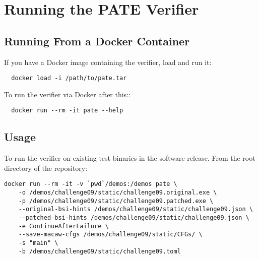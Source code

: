 
\section{Running the PATE Verifier}
\label{sec:runn-pate-verif}

\subsection{Running From a Docker Container}
\label{sec:running-from-docker}

If you have a Docker image containing the verifier, load and run it:
\begin{verbatim}
  docker load -i /path/to/pate.tar 
\end{verbatim}
To run the verifier via Docker after this::
\begin{verbatim}
  docker run --rm -it pate --help
\end{verbatim}

\subsection{Usage}
\label{sec:usage-examples}

To run the verifier on existing test binaries in the software release.
From the root directory of the repository:
\begin{verbatim}
docker run --rm -it -v `pwd`/demos:/demos pate \
    -o /demos/challenge09/static/challenge09.original.exe \
    -p /demos/challenge09/static/challenge09.patched.exe \
    --original-bsi-hints /demos/challenge09/static/challenge09.json \
    --patched-bsi-hints /demos/challenge09/static/challenge09.json \
    -e ContinueAfterFailure \
    --save-macaw-cfgs /demos/challenge09/static/CFGs/ \
    -s "main" \
    -b /demos/challenge09/static/challenge09.toml
\end{verbatim}





